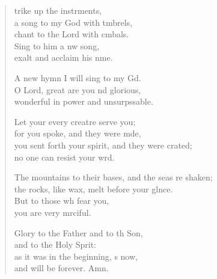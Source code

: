 \begin{verse}
  \begin{patverse}
    trike up the instrments,\Flex\\
a song to my God with t\pointup{\i}mbrels,\Med\\
chant to the Lord with cmbals.\\
Sing to him a nw song,\Med\\
exalt and acclaim his nme.

A new hymn I will sing to my Gd.\Flex\\
O Lord, great are you nd glorious,\Med\\
wonderful in power and unsurpssable.

Let your every creatre serve you;\Med\\
for you spoke, and they were mde,\\
you sent forth your spirit, and they were crated;\Med\\
no one can resist your wrd.

The mountains to their bases, and the seas re shaken;\Med\\
the rocks, like wax, melt before your glnce.\\
But to those wh fear you,\Med\\
you are very mrciful.

Glory to the Father and to th Son,\Med\\
and to the Holy Sp\pointup{\i}rit:\\
as it was in the beginning, \pointup{\i}s now,\Med\\
and will be forever. Amn. 
  \end{patverse}
\end{verse}
